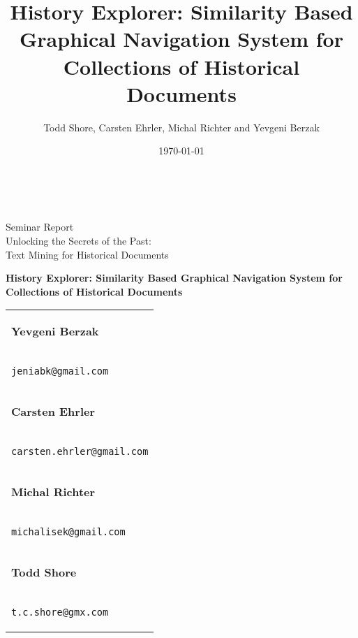 \documentclass[paper=a4,draft=false]{scrartcl}
\title{History Explorer: Similarity Based Graphical Navigation System for Collections of Historical Documents}
\author{Todd Shore, Carsten Ehrler, Michal Richter and Yevgeni Berzak}
\date{\today}
\begin{document}
\ifpdf
{}
\else
{}
\fi


\begin{titlepage}
\begin{center}
   \

   \vspace{.8in}
    \begin{large}
     Seminar Report \\
     \vspace{.1in}
      Unlocking the Secrets of the Past:\\
      Text Mining for Historical Documents\\
    \end{large}

    \vspace{1.2in}

   \begin{LARGE}
       \textbf{History Explorer: Similarity Based Graphical Navigation System for Collections of Historical Documents}
   \end{LARGE}

   \vspace{2.5in}

   \end{center}

   \begin{flushright}
   \begin{tabular}{l}
       \begin{large}\textbf{Yevgeni Berzak}\end{large} \\
       \begin{large}\texttt{jeniabk@gmail.com} \end{large}
       \vspace{.20in}\\
       \begin{large}\textbf{Carsten Ehrler}\end{large} \\
       \begin{large}\texttt{carsten.ehrler@gmail.com} \end{large}
       \vspace{.20in}\\
       \begin{large}\textbf{Michal Richter}\end{large} \\
       \begin{large}\texttt{michalisek@gmail.com} \end{large}
       \vspace{.20in}\\
       \begin{large}\textbf{Todd Shore}\end{large} \\
       \begin{large}\texttt{t.c.shore@gmx.com} \end{large}
   \end{tabular}
   \end{flushright}
\end{titlepage}
\end{document}
